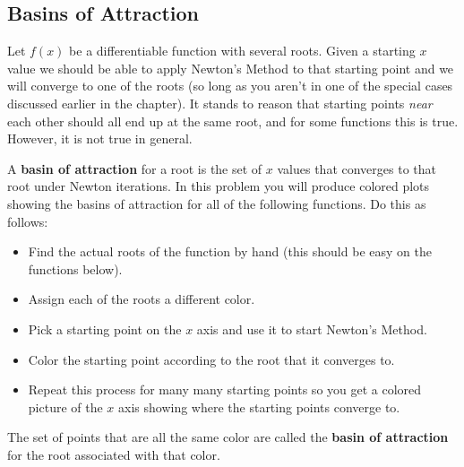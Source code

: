 \subsection{Basins of Attraction}

Let $f(x)$ be a differentiable function with several roots.  Given a starting $x$
value we should be able to apply Newton's Method to that starting point and we will
converge to one of the roots (so long as you aren't in one of the special cases
discussed earlier in the chapter).  It stands to reason that starting points {\it
near} each other should all end up at the same root, and for some functions this is
true.  However, it is not true in general.  

A {\bf basin of attraction} for a root is the set of $x$ values that converges to that
root under Newton iterations.  In this problem you will produce colored plots showing
the basins of attraction for all of the following functions.  Do this as follows:
\begin{itemize}
    \item Find the actual roots of the function by hand (this should be easy on the
        functions below).  
    \item Assign each of the roots a different color.
    \item Pick a starting point on the $x$ axis and use it to start Newton's Method.
    \item Color the starting point according to the root that it converges to.
    \item Repeat this process for many many starting points so you get a colored
        picture of the $x$ axis showing where the starting points converge to.
\end{itemize}
The set of points that are all the same color are called the {\bf basin of attraction}
for the root associated with that color.

